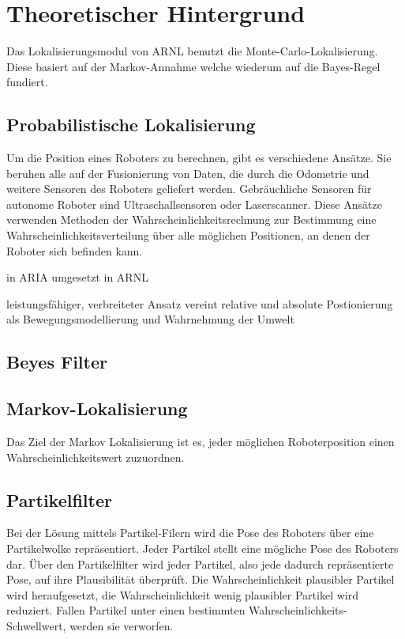\documentclass{article}
\begin{document}
\section{Theoretischer Hintergrund}
Das Lokalisierungsmodul von ARNL benutzt die Monte-Carlo-Lokalisierung. Diese basiert auf der Markov-Annahme welche wiederum auf die Bayes-Regel fundiert.




\subsection{Probabilistische Lokalisierung}
Um die Position eines Roboters zu berechnen, gibt es verschiedene Ansätze. Sie beruhen alle auf der Fusionierung von Daten, die durch die Odometrie und weitere Sensoren des Roboters geliefert werden. Gebräuchliche Sensoren für autonome Roboter sind Ultraschallsensoren oder Laserscanner.
Diese Ansätze verwenden Methoden der Wahrscheinlichkeitsrechnung zur Bestimmung eine Wahrscheinlichkeitsverteilung über alle möglichen Positionen, an denen der Roboter sich befinden kann.

in ARIA umgesetzt in ARNL

leistungsfähiger, verbreiteter Ansatz
vereint relative und absolute Postionierung als
 Bewegungsmodellierung und Wahrnehmung der Umwelt

\subsection{Beyes Filter}
\subsection{Markov-Lokalisierung}
Das Ziel der Markov Lokalisierung ist es, jeder möglichen Roboterposition einen
Wahrscheinlichkeitswert zuzuordnen.
\subsection{Partikelfilter}
Bei der Lösung mittels Partikel-Filern wird die Pose des Roboters über eine Partikelwolke repräsentiert. Jeder Partikel stellt eine mögliche Pose des Roboters dar. Über den Partikelfilter wird jeder Partikel, also jede dadurch repräsentierte Pose, auf ihre Plausibilität überprüft. Die Wahrscheinlichkeit plausibler Partikel wird heraufgesetzt, die Wahrscheinlichkeit wenig plausibler Partikel wird reduziert. Fallen Partikel unter einen bestimmten Wahrscheinlichkeits-Schwellwert, werden sie verworfen.
\end{document}
